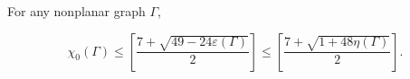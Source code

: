 For any nonplanar graph $\Gamma$,

$$\chi_0(\Gamma) \leq \left[ \frac{7 + \sqrt{49 - 24\varepsilon(\Gamma)}}{2} \right] \leq \left[ \frac{7 + \sqrt{1 + 48\eta(\Gamma)}}{2} \right].$$
